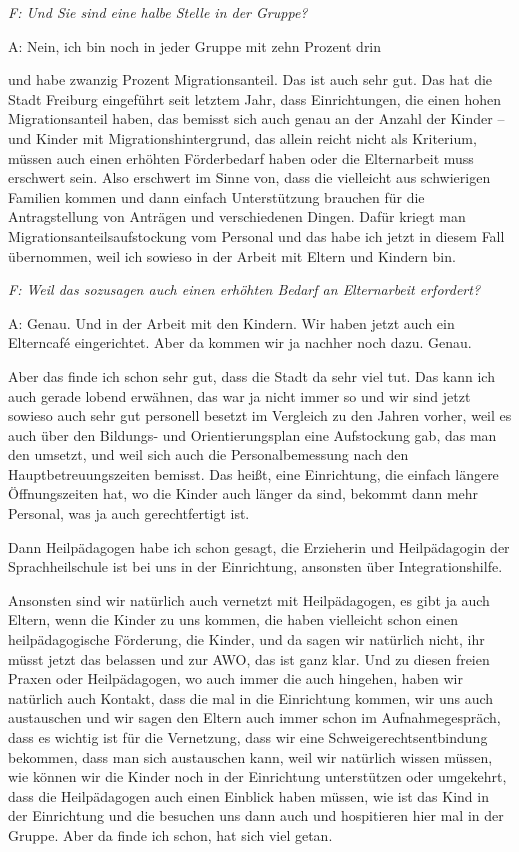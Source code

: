 \begin{linenumbers*}
\emph{F: Und Sie sind eine halbe Stelle in der Gruppe?}

A: Nein, ich bin noch in jeder Gruppe mit zehn Prozent drin 

und habe zwanzig Prozent Migrationsanteil. Das ist auch sehr gut. Das hat die Stadt Freiburg eingeführt seit letztem Jahr, dass Einrichtungen, die einen hohen Migrationsanteil haben, das bemisst sich auch genau an der Anzahl der Kinder -- und Kinder mit Migrationshintergrund, das allein reicht nicht als Kriterium, müssen auch einen erhöhten Förderbedarf haben oder die Elternarbeit muss erschwert sein. Also erschwert im Sinne von, dass die vielleicht aus schwierigen Familien kommen und dann einfach Unterstützung brauchen für die Antragstellung von Anträgen und verschiedenen Dingen. Dafür kriegt man Migrationsanteilsaufstockung vom Personal und das habe ich jetzt in diesem Fall übernommen, weil ich sowieso in der Arbeit mit Eltern und Kindern bin. 

\emph{F: Weil das sozusagen auch einen erhöhten Bedarf an Elternarbeit erfordert?}

A: Genau. Und in der Arbeit mit den Kindern. Wir haben jetzt auch ein Elterncafé eingerichtet. Aber da kommen wir ja nachher noch dazu. Genau. 

Aber das finde ich schon sehr gut, dass die Stadt da sehr viel tut. Das kann ich auch gerade lobend erwähnen, das war ja nicht immer so und wir sind jetzt sowieso auch sehr gut personell besetzt im Vergleich zu den Jahren vorher, weil es auch über den Bildungs- und Orientierungsplan eine Aufstockung gab, das man den umsetzt, und weil sich auch die Personalbemessung nach den Hauptbetreuungszeiten bemisst. Das heißt, eine Einrichtung, die einfach längere Öffnungszeiten hat, wo die Kinder auch länger da sind, bekommt dann mehr Personal, was ja auch gerechtfertigt ist. 

Dann Heilpädagogen habe ich schon gesagt, die Erzieherin und Heilpädagogin der Sprachheilschule ist bei uns in der Einrichtung, ansonsten über Integrationshilfe. 

Ansonsten sind wir natürlich auch vernetzt mit Heilpädagogen, es gibt ja auch Eltern, wenn die Kinder zu uns kommen, die haben vielleicht schon einen heilpädagogische Förderung, die Kinder, und da sagen wir natürlich nicht, ihr müsst jetzt das belassen und zur AWO, das ist ganz klar. Und zu diesen freien Praxen oder Heilpädagogen, wo auch immer die auch hingehen, haben wir natürlich auch Kontakt, dass die mal in die Einrichtung kommen, wir uns auch austauschen 
und wir sagen den Eltern auch immer schon im Aufnahmegespräch, dass es wichtig ist für die Vernetzung, dass wir eine Schweigerechtsentbindung bekommen, dass man sich austauschen kann, weil wir natürlich wissen müssen, wie können wir die Kinder noch in der Einrichtung unterstützen oder umgekehrt, dass die Heilpädagogen auch einen Einblick haben müssen, wie ist das Kind in der Einrichtung und die besuchen uns dann auch und hospitieren hier mal in der Gruppe. Aber da finde ich schon, hat sich viel getan.


\end{linenumbers*}
